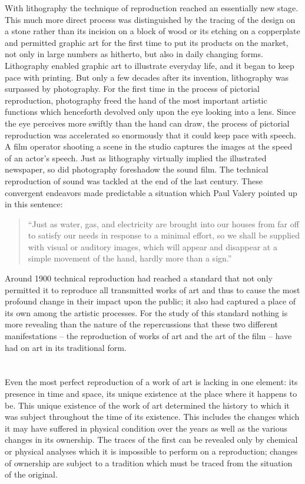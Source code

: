 \documentclass[11pt, letterpaper]{article}
\begin{document}
With lithography the technique of reproduction reached an essentially new
stage. This much more direct process was distinguished by the tracing of the
design on a stone rather than its incision on a block of wood or its etching on
a copperplate and permitted graphic art for the first time to put its products
on the market, not only in large numbers as hitherto, but also in daily
changing forms. Lithography enabled graphic art to illustrate everyday life,
and it began to keep pace with printing. But only a few decades after its
invention, lithography was surpassed by photography. For the first time in the
process of pictorial reproduction, photography freed the hand of the most
important artistic functions which henceforth devolved only upon the eye
looking into a lens. Since the eye perceives more swiftly than the hand can
draw, the process of pictorial reproduction was accelerated so enormously that
it could keep pace with speech. A film operator shooting a scene in the studio
captures the images at the speed of an actor’s speech. Just as lithography
virtually implied the illustrated newspaper, so did photography foreshadow the
sound film. The technical reproduction of sound was tackled at the end of the
last century. These convergent endeavors made predictable a situation which
Paul Valery pointed up in this sentence: 
\begin{quote}
	“Just as water, gas, and electricity are brought into our houses from far off
	to satisfy our needs in response to a minimal effort, so we shall be supplied
	with visual or auditory images, which will appear and disappear at a simple
	movement of the hand, hardly more than a sign.” 
\end{quote}

Around 1900 technical reproduction had reached a standard that not only
permitted it to reproduce all transmitted works of art and thus to cause the
most profound change in their impact upon the public; it also had captured a
place of its own among the artistic processes. For the study of this standard
nothing is more revealing than the nature of the repercussions that these two
different manifestations – the reproduction of works of art and the art of the
film – have had on art in its traditional form.

\section{}

Even the most perfect reproduction of a work of art is lacking in one element:
its presence in time and space, its unique existence at the place where it
happens to be. This unique existence of the work of art determined the history
to which it was subject throughout the time of its existence. This includes the
changes which it may have suffered in physical condition over the years as well
as the various changes in its ownership. The traces of the first can be
revealed only by chemical or physical analyses which it is impossible to
perform on a reproduction; changes of ownership are subject to a tradition
which must be traced from the situation of the original.
\end{document}
